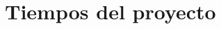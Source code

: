 \documentclass[12pt,a4paper]{article}
\begin{document}
\section{Tiempos del proyecto}
\end{document}
